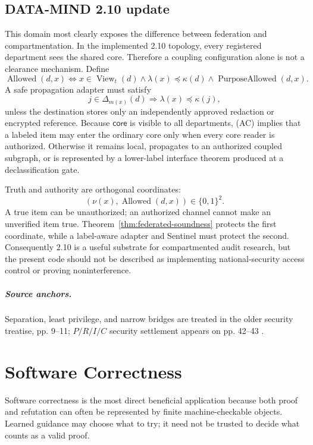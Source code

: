 \documentclass[11pt,oneside]{book}
\theoremstyle{definition}
\theoremstyle{remark}
\newcommand{\View}{\operatorname{View}}
\begin{document}
\section{DATA-MIND 2.10 update}
This domain most clearly exposes the difference between federation and compartmentation. In the
implemented 2.10 topology, every registered department sees the shared core. Therefore a coupling
configuration alone is not a clearance mechanism. Define
\[
\operatorname{Allowed}(d,x)
\iff x\in\View_t(d)\land \lambda(x)\preceq\kappa(d)
\land\operatorname{PurposeAllowed}(d,x).
\]
A safe propagation adapter must satisfy
\[
j\in\Delta_{m(x)}(d)\Longrightarrow
\lambda(x)\preceq\kappa(j),
\tag{AC}
\]
unless the destination stores only an independently approved redaction or encrypted reference.
Because \(\mathsf{core}\) is visible to all departments, (AC) implies that a labeled item may enter
the ordinary core only when every core reader is authorized. Otherwise it remains local, propagates
to an authorized coupled subgraph, or is represented by a lower-label interface theorem produced at
a declassification gate.

Truth and authority are orthogonal coordinates:
\[
(\nu(x),\operatorname{Allowed}(d,x))\in\{0,1\}^2.
\]
A true item can be unauthorized; an authorized channel cannot make an unverified item true.
Theorem~\ref{thm:federated-soundness} protects the first coordinate, while a label-aware adapter and
Sentinel must protect the second. Consequently 2.10 is a useful substrate for compartmented audit
research, but the present code should not be described as implementing national-security access
control or proving noninterference.

\paragraph{Source anchors.} Separation, least privilege, and narrow bridges are treated in the older
security treatise, pp. 9--11; $P/R/I/C$ security settlement appears on pp. 42--43
\cite{TennesonSecurity}.

\chapter{Software Correctness}
\label{ch:software}

Software correctness is the most direct beneficial application because both proof and refutation can
often be represented by finite machine-checkable objects. Learned guidance may choose what to try;
it need not be trusted to decide what counts as a valid proof.
\end{document}
